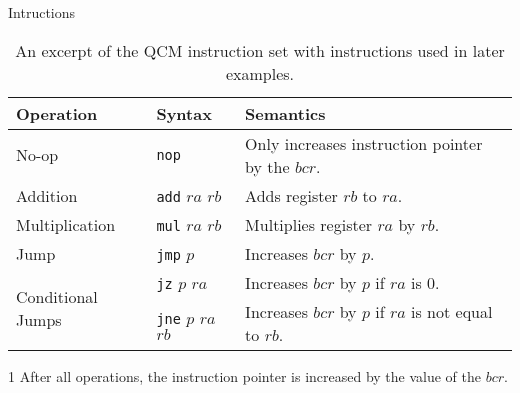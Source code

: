 \begin{frame}{Intructions}
    \begin{table}[htp]
        \centering
        \begin{threeparttable}[b]
            \begin{tabular}{llp{}}
                \multicolumn{1}{l|}{Operation}                          & \multicolumn{1}{l|}{Syntax}                                      & Semantics\tnote{1}                                                              \\ \hline
                
                \multicolumn{1}{l|}{No-op}                              & \multicolumn{1}{l|}{\texttt{nop}}               & Only increases instruction pointer by the $bcr$.     \\ \hline
                
                \multicolumn{1}{l|}{Addition}                           & \multicolumn{1}{l|}{\texttt{add} $ra$ $rb$}     & Adds register $rb$ to $ra$.                                            \\
                \multicolumn{1}{l|}{Multiplication}                     & \multicolumn{1}{l|}{\texttt{mul} $ra$ $rb$}     & Multiplies register $ra$ by $rb$.                                      \\ \hline
                
                \multicolumn{1}{l|}{Jump}                               & \multicolumn{1}{l|}{\texttt{jmp} $p$}           & Increases $bcr$ by $p$.                              \\
                \multicolumn{1}{l|}{\multirow{2}{*}{Conditional Jumps}} & \multicolumn{1}{l|}{\texttt{jz} $p$ $ra$}       & Increases $bcr$ by $p$ if $ra$ is $0$.               \\
                \multicolumn{1}{l|}{}                                   & \multicolumn{1}{l|}{\texttt{jne} $p$ $ra$ $rb$} & Increases $bcr$ by $p$ if $ra$ is not equal to $rb$. 
            \end{tabular}
            \begin{tablenotes}
                \item [1] After all operations, the instruction pointer is increased by the value of the $bcr$.
            \end{tablenotes}
        \end{threeparttable}
        \caption{An excerpt of the QCM instruction set with instructions used in later examples.}
        \label{tab:qcm_instructionset}
    \end{table}
\end{frame}

